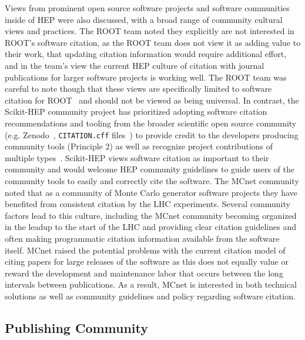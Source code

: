Views from prominent open source software projects and software communities inside of HEP were also discussed, with a broad range of community cultural views and practices.
The ROOT team noted they explicitly are not interested in ROOT's software citation, as the ROOT team does not view it as adding value to their work, that updating citation information would require additional effort, and in the team's view the current HEP culture of citation with journal publications for larger software projects is working well.
The ROOT team was careful to note though that these views are specifically limited to software citation for ROOT~\cite{Brun:1997pa} and should not be viewed as being universal.
In contrast, the Scikit-HEP community project has prioritized adopting software citation recommendations and tooling from the broader scientific open source community (e.g. Zenodo~\cite{zenodo}, \texttt{CITATION.cff} files~\cite{Druskat_Citation_File_Format_2021}) to provide credit to the developers producing community tools (Principle 2) as well as recognize project contributions of multiple types~\cite{all-contributors}.
Scikit-HEP views software citation as important to their community and would welcome HEP community guidelines to guide users of the community tools to easily and correctly cite the software.
The MCnet community noted that as a community of Monte Carlo generator software projects they have benefited from consistent citation by the LHC experiments.
Several community factors lead to this culture, including the MCnet community becoming organized in the leadup to the start of the LHC and providing clear citation guidelines and often making programmatic citation information available from the software itself.
MCnet raised the potential problems with the current citation model of citing papers for large releases of the software as this does not equally value or reward the development and maintenance labor that occurs between the long intervals between publications.
As a result, MCnet is interested in both technical solutions as well as community guidelines and policy regarding software citation.


\subsection{Publishing Community}\label{sec:publishers}

